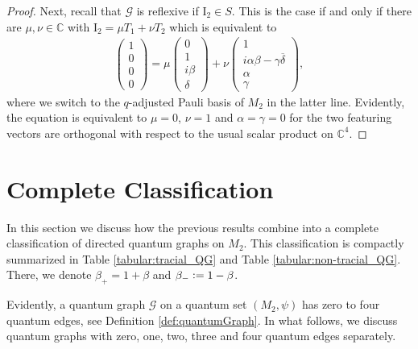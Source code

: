\documentclass{amsart}
\newcommand{\C}{\mathbb{C}}
\begin{document}
\begin{proof}
    Next, recall that $\mathcal{G}$ is reflexive if $\mathrm{I}_2 \in S$. This is the case if and only if there are $\mu, \nu \in \C$ with $\mathrm{I}_2 = \mu T_1 + \nu T_2$ which is equivalent to
    \begin{align*}
        \begin{pmatrix}
            1 \\ 0 \\ 0 \\ 0
        \end{pmatrix}
        = \mu \begin{pmatrix}
            0 \\ 1 \\ i \beta \\ \delta
        \end{pmatrix}
        + \nu \begin{pmatrix}
            1 \\ i \alpha \beta - \gamma \overline{\delta} \\ \alpha \\ \gamma
        \end{pmatrix},
    \end{align*}
    where we switch to the $q$-adjusted Pauli basis of $M_2$ in the latter line. Evidently, the equation is equivalent to $\mu = 0$, $\nu = 1$ and $\alpha = \gamma = 0$ for the two featuring vectors are orthogonal with respect to the usual scalar product on $\C^4$.
\end{proof}



\section{Complete Classification}
\label{sec::cc}

In this section we discuss how the previous results combine into a complete classification of directed quantum graphs on $M_2$. This classification is compactly summarized in Table \ref{tabular:tracial_QG} and Table \ref{tabular:non-tracial_QG}. There, we denote $\beta_+=1+\beta$ and $\beta_-\vcentcolon=1-\beta$. 

Evidently, a quantum graph $\mathcal{G}$ on a quantum set $(M_2,\psi)$ has zero to four quantum edges, see Definition \ref{def:quantumGraph}. In what follows, we discuss quantum graphs with zero, one, two, three and four quantum edges separately.
\end{document}
